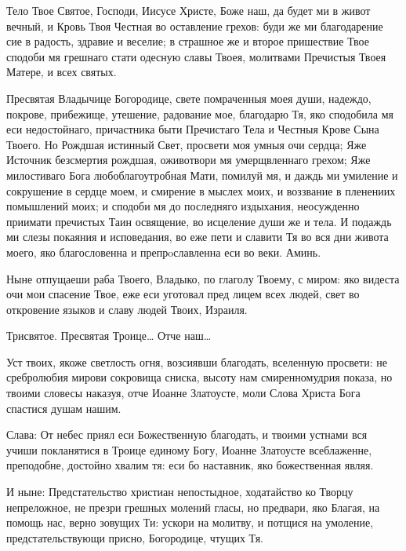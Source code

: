 

Тело Твое Святое, Господи, Иисусе Христе, Боже наш, да будет ми в живот вечный, и Кровь Твоя Честная во оставление грехов: буди же ми благодарение сие в радость, здравие и веселие; в страшное же и второе пришествие Твое сподоби мя грешнаго стати одесную славы Твоея, молитвами Пречистыя Твоея Матере, и всех святых.




Пресвятая Владычице Богородице, свете помраченныя моея души, надеждо, покрове, прибежище, утешение, радование мое, благодарю Тя, яко сподобила мя еси недостойнаго, причастника быти Пречистаго Тела и Честныя Крове Сына Твоего. Но Рождшая истинный Свет, просвети моя умныя очи сердца; Яже Источник безсмертия рождшая, оживотвори мя умерщвленнаго грехом; Яже милостиваго Бога любоблагоутробная Мати, помилуй мя, и даждь ми умиление и сокрушение в сердце моем, и смирение в мыслех моих, и воззвание в пленениих помышлений моих; и сподоби мя до последняго издыхания, неосужденно приимати пречистых Таин освящение, во исцеление души же и тела. И подаждь ми слезы покаяния и исповедания, во еже пети и славити Тя во вся дни живота моего, яко благословенна и препрoславленна еси во веки. Аминь.


Ныне отпущаеши раба Твоего, Владыко, по глаголу Твоему, с миром: яко видеста очи мои спасение Твое, еже еси уготовал пред лицем всех людей, свет во откровение языков и славу людей Твоих, Израиля.


Трисвятое. Пресвятая Троице… Отче наш…






Уст твоих, якоже светлость огня, возсиявши благодать, вселенную просвети: не сребролюбия мирови сокровища сниска, высоту нам смиренномудрия показа, но твоими словесы наказуя, отче Иоанне Златоусте, моли Слова Христа Бога спастися душам нашим.




Слава: От небес приял еси Божественную благодать, и твоими устнами вся учиши покланятися в Троице единому Богу, Иоанне Златоусте всеблаженне, преподобне, достойно хвалим тя: еси бо наставник, яко божественная являя.


И ныне: Предстательство христиан непостыдное, ходатайство ко Творцу непреложное, не презри грешных молений гласы, но предвари, яко Благая, на помощь нас, верно зовущих Ти: ускори на молитву, и потщися на умоление, предстательствующи присно, Богородице, чтущих Тя.


